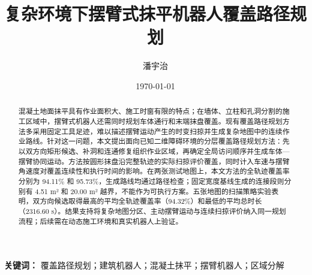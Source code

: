 \documentclass[UTF8,a4paper,11pt,fontset=none]{ctexart}
\title{复杂环境下摆臂式抹平机器人覆盖路径规划}
\author{ 潘宇治}
\date{\today}
\begin{document}
\maketitle

\begin{abstract}
混凝土地面抹平具有作业面积大、施工时窗有限的特点；在墙体、立柱和孔洞分割的施工区域中，摆臂式机器人还需同时规划车体通行和末端抹盘覆盖。现有覆盖路径规划方法多采用固定工具足迹，难以描述摆臂运动产生的时变扫掠并生成复杂地图中的连续作业路线。针对这一问题，本文提出面向已知二维障碍环境的分层覆盖路径规划方法：先以双方向矩形候选、补洞和连通修复组织作业区域，再确定全局访问顺序并生成车体—摆臂协同运动。方法按圆形抹盘沿完整轨迹的实际扫掠评价覆盖，同时计入车速与摆臂角速度对覆盖连续性和执行时间的影响。在两张测试地图上，本文方法的全轨迹覆盖率分别为 94.11\% 和 95.73\%，生成路线均通过路径检查；固定宽度基线生成的连接段则分别有 4.51 m² 和 20.00 m² 越界，不能作为可执行方案。五张地图的扫描策略实验表明，双方向候选取得最高的平均全轨迹覆盖率（94.32\%）和最低的平均总时长（2316.60 s）。结果支持将复杂地图分区、主动摆臂运动与连续扫掠评价纳入同一规划流程；后续需在动态施工环境和真实机器人上验证。
\end{abstract}

\noindent\textbf{关键词：} 覆盖路径规划；建筑机器人；混凝土抹平；摆臂机器人；区域分解


\nocite{*}

\begingroup
\small

\endgroup
\end{document}

